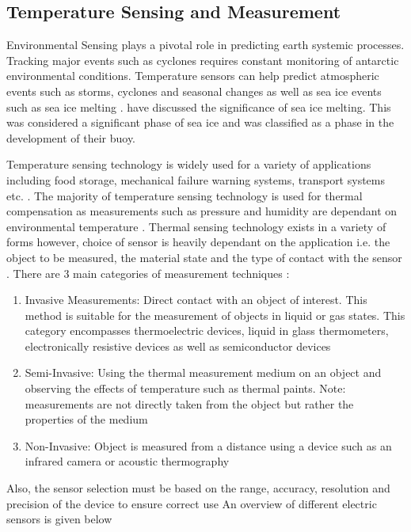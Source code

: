 \subsection{Temperature Sensing and Measurement}

Environmental Sensing plays a pivotal role in predicting earth systemic processes. Tracking major events such as cyclones \cite{vichi2019effects} requires constant monitoring of antarctic environmental conditions. Temperature sensors can help predict atmospheric events such as storms, cyclones and seasonal changes as well as sea ice events such as sea ice melting \cite{kohout2015device} \cite{doble2017robust}. \textcite{doble2017robust} have discussed the significance of sea ice melting. This was considered a significant phase of sea ice and was classified as a phase in the development of their buoy. \par 

Temperature sensing technology is widely used for a variety of applications including food storage, mechanical failure warning systems, transport systems etc. \cite{awtrey2002environmental}. The majority of temperature sensing technology is used for thermal compensation as measurements such as pressure and humidity are dependant on environmental temperature \cite{mansoor2015silicon}. Thermal sensing technology exists in a variety of forms however, choice of sensor is heavily dependant on the application i.e. the object to be measured, the material state and the type of contact with the sensor \cite{mansoor2015silicon}\cite{childs2000review}. There are 3 main categories of measurement techniques \cite{childs2000review}:
\begin{enumerate}
	\item Invasive Measurements: Direct contact with an object of interest. This method is suitable for the measurement of objects in liquid or gas states. This category encompasses thermoelectric devices, liquid in glass thermometers, electronically resistive devices as well as semiconductor devices \cite{mansoor2015silicon}
	\item Semi-Invasive: Using the thermal measurement medium on an object and observing the effects of temperature such as thermal paints. Note: measurements are not directly taken from the object but rather the properties of the medium
	\item Non-Invasive: Object is measured from a distance using a device such as an infrared camera or acoustic thermography
\end{enumerate}
Also, the sensor selection must be based on the range, accuracy, resolution and precision of the device to ensure correct use An overview of different electric sensors is given below \cite{childs2000review}
